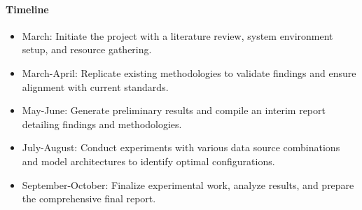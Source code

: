 \documentclass[11pt]{article}
\begin{document}
\paragraph{Timeline}
\begin{itemize}[noitemsep]
	\item March: Initiate the project with a literature review, system environment setup, and resource gathering.
	\item March-April: Replicate existing methodologies to validate findings and ensure alignment with current standards.
	\item May-June: Generate preliminary results and compile an interim report detailing findings and methodologies.
	\item July-August: Conduct experiments with various data source combinations and model architectures to identify optimal configurations.
	\item September-October: Finalize experimental work, analyze results, and prepare the comprehensive final report.
\end{itemize}

\noindent
\end{document}
